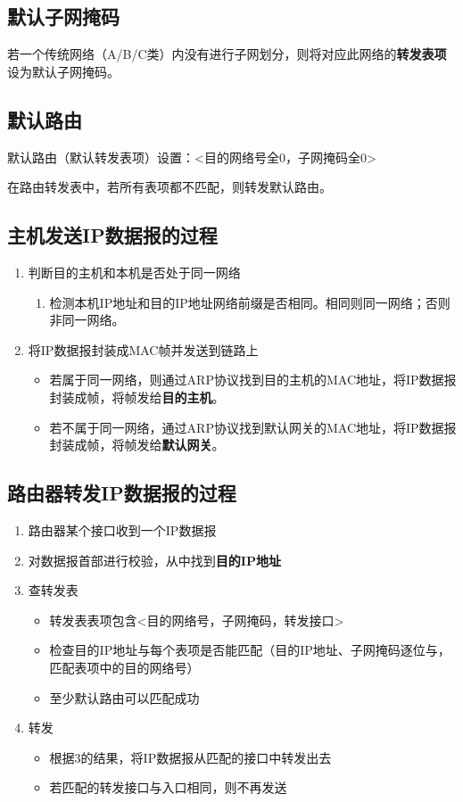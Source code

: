 \subsection{默认子网掩码}
若一个传统网络（A/B/C类）内没有进行子网划分，则将对应此网络的\textbf{转发表项}设为默认子网掩码。


\subsection{默认路由}
默认路由（默认转发表项）设置：<目的网络号全0，子网掩码全0>

在路由转发表中，若所有表项都不匹配，则转发默认路由。


\subsection{主机发送IP数据报的过程}
\begin{enumerate}
    \item 判断目的主机和本机是否处于同一网络\begin{enumerate}
        \item 检测本机IP地址和目的IP地址网络前缀是否相同。相同则同一网络；否则非同一网络。
    \end{enumerate}
    \item 将IP数据报封装成MAC帧并发送到链路上\begin{itemize}
        \item 若属于同一网络，则通过ARP协议找到目的主机的MAC地址，将IP数据报封装成帧，将帧发给\textbf{目的主机}。
        \item 若不属于同一网络，通过ARP协议找到默认网关的MAC地址，将IP数据报封装成帧，将帧发给\textbf{默认网关}。
    \end{itemize}
\end{enumerate}


\subsection{路由器转发IP数据报的过程}
\begin{enumerate}
    \item 路由器某个接口收到一个IP数据报
    \item 对数据报首部进行校验，从中找到\textbf{目的IP地址}
    \item 查转发表\begin{itemize}
        \item 转发表表项包含<目的网络号，子网掩码，转发接口>
        \item 检查目的IP地址与每个表项是否能匹配（目的IP地址、子网掩码逐位与，匹配表项中的目的网络号）
        \item 至少默认路由可以匹配成功
    \end{itemize}
    \item 转发\begin{itemize}
        \item 根据3的结果，将IP数据报从匹配的接口中转发出去
        \item 若匹配的转发接口与入口相同，则不再发送
    \end{itemize}
\end{enumerate}


